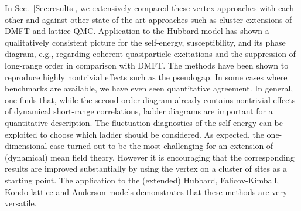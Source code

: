 \documentclass[rmp,aps,reprint,amsmath,amssymb,superscriptaddress,showpacs,nofootinbib]{revtex4-1}
\newcommand{\qv}{\ensuremath{\mathbf{q}}}
\begin{document}
\begin{table*}[tb]
    \caption{Summary of the various closely related diagrammatic extensions of DMFT. The {\em first column} denotes the method and the {\em second column} the local vertex function  that serves as a starting point; these are the different two-particle vertices defined in Sec.~\ref{sec:formalism}\footnote{1PI and DMF$^2$RG expand in terms of 1PI vertices, which for the {\em two-particle  vertex} happens to be identical to the full vertex $F$ used in DF. Even if truncated at the two-particle level,  the difference in the  expansion scheme leads none\-the\-less to distinct 1PI and DF methods; see Sec.~\ref{subsec:1pi}.\label{note1PI}} and  the  bosonic three-leg vertex $\gamma_{\nu \omega}$. The {\em third column} identifies the Green's function lines connecting these local building blocks via the Feynman diagrams of the {\em fourth column}.\footnote{$G_{\nu}^{\rm loc}$ is the local propagator of the reference system and  $\widetilde{G}_{0, {{\mathbf k}\nu}}$ the nonlocal lattice propagator constructed with the local self-energy of the reference system  [Eqs.~\eqref{equ:dualgaussfinal}, \eqref{equ:cap4nambubare}, and \eqref{eq:tildeG0}]; $\widetilde{W}_{0,\qv\omega}$ is a corresponding bosonic (interaction) propagator  [Eq.~\eqref{eq:tildeW0}].} The {\em last column} denotes the fundamental functional $\mathcal{K}$ or the action ${\mathcal{S}}$ of the functional integral the method is based on. Here DF and DB introduce dual fermionic $\tilde{c}^{(\dagger)}$ and bosonic variables  $\tilde{\rho}^{(*)}$. For further details we refer the reader to the corresponding sections.}
  \label{Table:alg}
\end{table*}

In Sec.~\ref{Sec:results}, we extensively compared these vertex approaches with each other and against other state-of-the-art approaches such as cluster extensions of DMFT and lattice QMC. Application to the Hubbard model has shown a qualitatively consistent picture for the self-energy, susceptibility, and its phase diagram, e.g., regarding coherent quasiparticle excitations and the suppression of long-range order in comparison with DMFT. The methods have been shown to reproduce highly nontrivial effects such as the pseudogap. In some cases where benchmarks are available, we have even seen quantitative agreement. In general, one finds that, while the second-order diagram already contains nontrivial effects of dynamical short-range correlations, ladder diagrams are important for a quantitative description. The fluctuation diagnostics  of the self-energy can be exploited to choose which ladder should be considered. As expected, the one-dimensional case turned out to be the most challenging for an extension of (dynamical) mean field theory. However it is encouraging that the corresponding results are improved substantially by using the vertex on a cluster of sites as a starting point. The application to the (extended) Hubbard, Falicov-Kimball, Kondo lattice and Anderson models demonstrates that these methods are very versatile.
\end{document}
